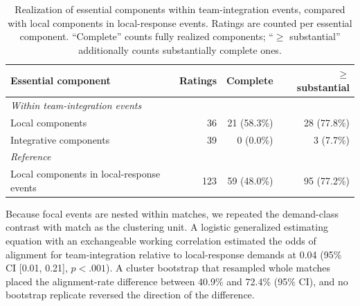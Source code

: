 \documentclass[manuscript,review,anonymous]{acmart}
\begin{document}
\begin{table}[tbp]
\centering
\caption{Realization of essential components within team-integration events, compared with local components in local-response events. Ratings are counted per essential component. ``Complete'' counts fully realized components; ``$\geq$ substantial'' additionally counts substantially complete ones.}
\label{tab:component-realization}
\small
\begin{tabular}{lrrr}
\toprule
\textbf{Essential component} & \textbf{Ratings} & \textbf{Complete} & \textbf{$\geq$ substantial} \\
\midrule
\multicolumn{4}{l}{\emph{Within team-integration events}} \\
\quad Local components & 36 & 21 (58.3\%) & 28 (77.8\%) \\
\quad Integrative components & 39 & 0 (0.0\%) & 3 (7.7\%) \\
\midrule
\multicolumn{4}{l}{\emph{Reference}} \\
\quad Local components in local-response events & 123 & 59 (48.0\%) & 95 (77.2\%) \\
\bottomrule
\end{tabular}
\end{table}

Because focal events are nested within matches, we repeated the demand-class contrast with match as the clustering unit. A logistic generalized estimating equation with an exchangeable working correlation estimated the odds of alignment for team-integration relative to local-response demands at 0.04 (95\% CI [0.01, 0.21], $p<.001$). A cluster bootstrap that resampled whole matches placed the alignment-rate difference between 40.9\% and 72.4\% (95\% CI), and no bootstrap replicate reversed the direction of the difference.
\end{document}
